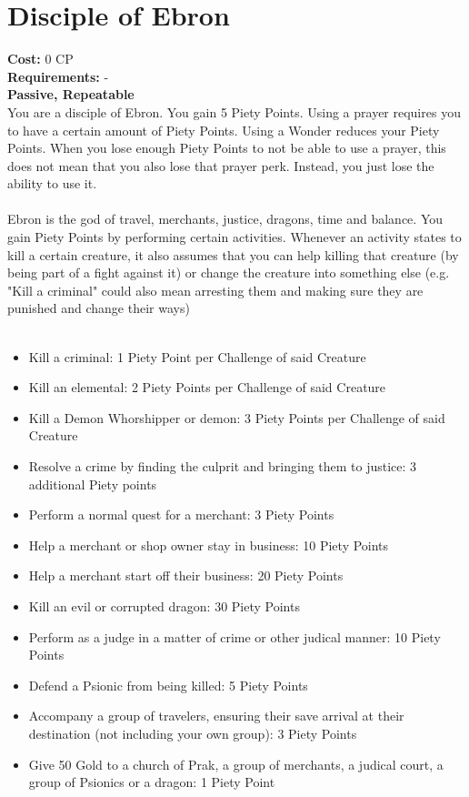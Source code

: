 \section{Disciple of Ebron}
\textbf{Cost:} 0 CP\\
\textbf{Requirements:} - \\
\textbf{Passive, Repeatable}\\
You are a disciple of Ebron. You gain 5 Piety Points. Using a prayer requires you to have a certain amount of Piety Points. Using a Wonder reduces your Piety Points. When you lose enough Piety Points to not be able to use a prayer, this does not mean that you also lose that prayer perk. Instead, you just lose the ability to use it.\\
\\
Ebron is the god of travel, merchants, justice, dragons, time and balance. You gain Piety Points by performing certain activities. Whenever an activity states to kill a certain creature, it also assumes that you can help killing that creature (by being part of a fight against it) or change the creature into something else (e.g. "Kill a criminal" could also mean arresting them and making sure they are punished and change their ways)\\
\\
\begin{itemize}
	\item Kill a criminal: 1 Piety Point per Challenge of said Creature
	\item Kill an elemental: 2 Piety Points per Challenge of said Creature
	\item Kill a Demon Whorshipper or demon: 3 Piety Points per Challenge of said Creature
	\item Resolve a crime by finding the culprit and bringing them to justice: 3 additional Piety points
	\item Perform a normal quest for a merchant: 3 Piety Points
	\item Help a merchant or shop owner stay in business: 10 Piety Points
	\item Help a merchant start off their business: 20 Piety Points
	\item Kill an evil or corrupted dragon: 30 Piety Points
	\item Perform as a judge in a matter of crime or other judical manner: 10 Piety Points
	\item Defend a Psionic from being killed: 5 Piety Points
	\item Accompany a group of travelers, ensuring their save arrival at their destination (not including your own group): 3 Piety Points
	\item Give 50 Gold to a church of Prak, a group of merchants, a judical court, a group of Psionics or a dragon: 1 Piety Point
\end{itemize}

